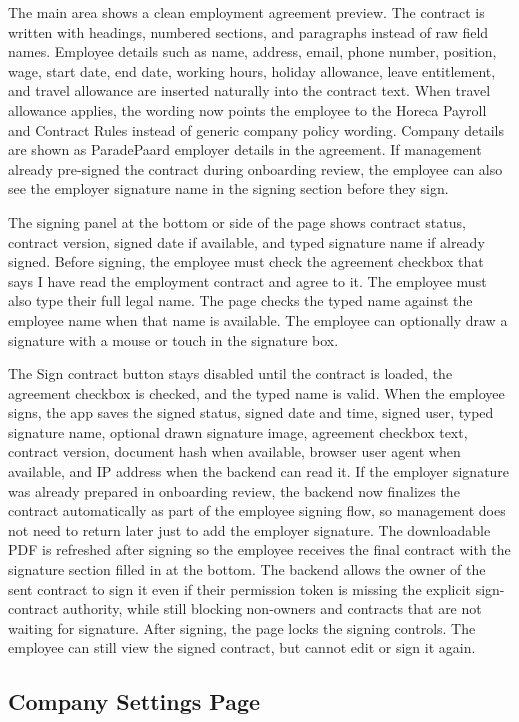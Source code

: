 \documentclass[11pt]{article}
\begin{document}
The main area shows a clean employment agreement preview. The contract is written with headings, numbered sections, and paragraphs instead of raw field names. Employee details such as name, address, email, phone number, position, wage, start date, end date, working hours, holiday allowance, leave entitlement, and travel allowance are inserted naturally into the contract text. When travel allowance applies, the wording now points the employee to the Horeca Payroll and Contract Rules instead of generic company policy wording. Company details are shown as ParadePaard employer details in the agreement. If management already pre-signed the contract during onboarding review, the employee can also see the employer signature name in the signing section before they sign.

The signing panel at the bottom or side of the page shows contract status, contract version, signed date if available, and typed signature name if already signed. Before signing, the employee must check the agreement checkbox that says I have read the employment contract and agree to it. The employee must also type their full legal name. The page checks the typed name against the employee name when that name is available. The employee can optionally draw a signature with a mouse or touch in the signature box.

The Sign contract button stays disabled until the contract is loaded, the agreement checkbox is checked, and the typed name is valid. When the employee signs, the app saves the signed status, signed date and time, signed user, typed signature name, optional drawn signature image, agreement checkbox text, contract version, document hash when available, browser user agent when available, and IP address when the backend can read it. If the employer signature was already prepared in onboarding review, the backend now finalizes the contract automatically as part of the employee signing flow, so management does not need to return later just to add the employer signature. The downloadable PDF is refreshed after signing so the employee receives the final contract with the signature section filled in at the bottom. The backend allows the owner of the sent contract to sign it even if their permission token is missing the explicit sign-contract authority, while still blocking non-owners and contracts that are not waiting for signature. After signing, the page locks the signing controls. The employee can still view the signed contract, but cannot edit or sign it again.

\subsection{Company Settings Page}
\end{document}
